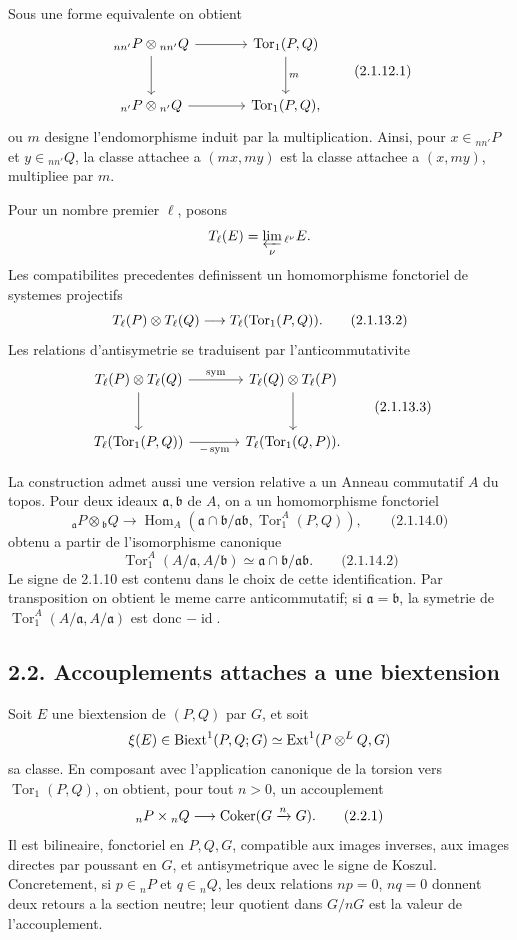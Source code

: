 \documentclass[11pt]{article}
\providecommand{\Tor}{\operatorname{Tor}}
\providecommand{\Hom}{\operatorname{Hom}}
\providecommand{\Ext}{\operatorname{Ext}}
\providecommand{\id}{\operatorname{id}}
\begin{document}
Sous une forme equivalente on obtient
\[
\begin{tikzcd}[column sep=large,row sep=large]
 {}_{nn'}P\otimes {}_{nn'}Q \arrow[r]\arrow[d] & \Tor_1(P,Q)\arrow[d,"m"]\\
 {}_{n'}P\otimes {}_{n'}Q \arrow[r] & \Tor_1(P,Q),
\end{tikzcd}
\qquad\text{(2.1.12.1)}
\]
ou \(m\) designe l'endomorphisme induit par la multiplication.  Ainsi, pour \(x\in{}_{nn'}P\) et \(y\in{}_{nn'}Q\), la classe attachee a \((mx,my)\) est la classe attachee a \((x,my)\), multipliee par \(m\).

Pour un nombre premier \(\ell\), posons
\[
        T_\ell(E)=\varprojlim_\nu {}_{\ell^\nu}E.
\]
Les compatibilites precedentes definissent un homomorphisme fonctoriel de systemes projectifs
\[
        \Tate_\ell(P)\otimes \Tate_\ell(Q)
        \longrightarrow \Tate_\ell(\Tor_1(P,Q)).
\qquad\text{(2.1.13.2)}
\]
Les relations d'antisymetrie se traduisent par l'anticommutativite
\[
\begin{tikzcd}[column sep=large,row sep=large]
 \Tate_\ell(P)\otimes \Tate_\ell(Q) \arrow[r,"\mathrm{sym}"]\arrow[d] &
 \Tate_\ell(Q)\otimes \Tate_\ell(P)\arrow[d]\\
 \Tate_\ell(\Tor_1(P,Q))\arrow[r,"-\,\mathrm{sym}"'] &
 \Tate_\ell(\Tor_1(Q,P)).
\end{tikzcd}
\qquad\text{(2.1.13.3)}
\]

La construction admet aussi une version relative a un Anneau commutatif \(A\) du topos.  Pour deux ideaux \(\mathfrak a,\mathfrak b\) de \(A\), on a un homomorphisme fonctoriel
\[
        {}_{\mathfrak a}P\otimes {}_{\mathfrak b}Q
        \longrightarrow
        \Hom_A(\mathfrak a\cap\mathfrak b/\mathfrak a\mathfrak b,\Tor_1^A(P,Q)),
\qquad\text{(2.1.14.0)}
\]
obtenu a partir de l'isomorphisme canonique
\[
        \Tor_1^A(A/\mathfrak a,A/\mathfrak b)
        \simeq \mathfrak a\cap\mathfrak b/\mathfrak a\mathfrak b.
\qquad\text{(2.1.14.2)}
\]
Le signe de 2.1.10 est contenu dans le choix de cette identification.  Par transposition on obtient le meme carre anticommutatif; si \(\mathfrak a=\mathfrak b\), la symetrie de \(\Tor_1^A(A/\mathfrak a,A/\mathfrak a)\) est donc \(-\id\).

\subsection*{2.2. Accouplements attaches a une biextension}

Soit \(E\) une biextension de \((P,Q)\) par \(G\), et soit
\[
        \xi(E)\in \Biext^1(P,Q;G)\simeq \Ext^1(P\otimes^L Q,G)
\]
sa classe.  En composant avec l'application canonique de la torsion vers \(\Tor_1(P,Q)\), on obtient, pour tout \(n>0\), un accouplement
\[
        {}_nP\times {}_nQ\longrightarrow \operatorname{Coker}(G\xrightarrow{n}G).
\qquad\text{(2.2.1)}
\]
Il est bilineaire, fonctoriel en \(P,Q,G\), compatible aux images inverses, aux images directes par poussant en \(G\), et antisymetrique avec le signe de Koszul.  Concretement, si \(p\in{}_nP\) et \(q\in{}_nQ\), les deux relations \(np=0\), \(nq=0\) donnent deux retours a la section neutre; leur quotient dans \(G/nG\) est la valeur de l'accouplement.
\end{document}
